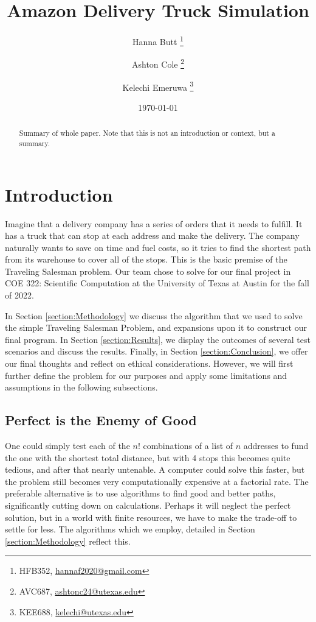 \documentclass[letterpaper]{article}
\title{Amazon Delivery Truck Simulation}
\author{Hanna Butt \thanks{HFB352, \href{mailto:hannaf2020@gmail.com}{hannaf2020@gmail.com}} \and Ashton Cole \thanks{AVC687, \href{mailto:ashtonc24@utexas.edu}{ashtonc24@utexas.edu}} \and Kelechi Emeruwa \thanks{KEE688, \href{mailto:kelechi@utexas.edu}{kelechi@utexas.edu}}}
\date{\today}
\begin{document}
    \maketitle

    \begin{abstract}
        Summary of whole paper. Note that this is not an introduction or context, but a summary.
    \end{abstract}

    \section{Introduction}
    \label{section:Introduction}
    Imagine that a delivery company has a series of orders that it needs to fulfill. It has a truck that can stop at each address and make the delivery. The company naturally wants to save on time and fuel costs, so it tries to find the shortest path from its warehouse to cover all of the stops. This is the basic premise of the Traveling Salesman problem. Our team chose to solve for our final project in COE 322: Scientific Computation at the University of Texas at Austin for the fall of 2022.
    
    In Section \ref{section:Methodology} we discuss the algorithm that we used to solve the simple Traveling Salesman Problem, and expansions upon it to construct our final program. In Section \ref{section:Results}, we display the outcomes of several test scenarios and discuss the results. Finally, in Section \ref{section:Conclusion}, we offer our final thoughts and reflect on ethical considerations. However, we will first further define the problem for our purposes and apply some limitations and assumptions in the following subsections.

    \subsection{Perfect is the Enemy of Good}
    \label{subsection:Perfect_is_the_Enemy_of_Good}
    One could simply test each of the $n!$ combinations of a list of $n$ addresses to fund the one with the shortest total distance, but with 4 stops this becomes quite tedious, and after that nearly untenable. A computer could solve this faster, but the problem still becomes very computationally expensive at a factorial rate. The preferable alternative is to use algorithms to find good and better paths, significantly cutting down on calculations. Perhaps it will neglect the perfect solution, but in a world with finite resources, we have to make the trade-off to settle for less. The algorithms which we employ, detailed in Section \ref{section:Methodology} reflect this.
\end{document}
